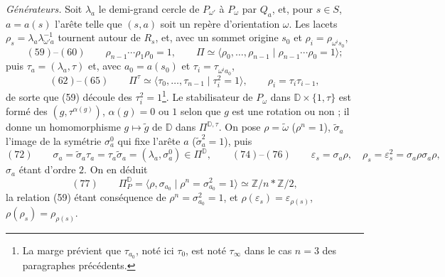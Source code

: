 \documentclass[11pt,a4paper]{article}
\begin{document}
\emph{Générateurs.} Soit $\lambda_a$ le demi-grand cercle de $P_{\omega'}$ à
$P_\omega$ par $Q_a$, et, pour $s \in S$, $a = a(s)$ l'arête telle que
$(s, a)$ soit un repère d'orientation $\omega$. Les lacets
$\rho_s = \lambda_a\lambda_{\omega' a}^{-1}$ tournent autour de $R_s$, et, avec
un sommet origine $s_0$ et $\rho_i = \rho_{\omega^i s_0}$,
\[
(59)\text{--}(60)\qquad \rho_{n-1}\cdots\rho_1\rho_0 = 1, \qquad
\Pi \simeq \langle \rho_0, \ldots, \rho_{n-1} \mid \rho_{n-1}\cdots\rho_0 = 1 \rangle ;
\]
puis $\tau_a = (\lambda_a, \tau)$ et, avec $a_0 = a(s_0)$ et
$\tau_i = \tau_{\omega^i a_0}$,
\[
(62)\text{--}(65)\qquad \Pi^{\tau} \simeq \langle \tau_0, \ldots, \tau_{n-1} \mid \tau_i^2 = 1 \rangle, \qquad \rho_i = \tau_i\tau_{i-1},
\]
de sorte que (59) découle des $\tau_i^2 = 1$\footnote{La marge prévient que
$\tau_{a_0}$, noté ici $\tau_0$, est noté $\tau_\infty$ dans le cas $n = 3$ des
paragraphes précédents.}. Le stabilisateur de $P_\omega$ dans
$\mathbb{D} \times \{1, \tau\}$ est formé des $(g, \tau^{\alpha(g)})$,
$\alpha(g) = 0$ ou $1$ selon que $g$ est une rotation ou non ; il donne un
homomorphisme $g \mapsto \tilde g$ de $\mathbb{D}$ dans $\Pi^{\mathbb{D},\tau}$.
On pose $\rho = \tilde\omega$ ($\rho^n = 1$), $\tilde\sigma_a$ l'image de la
symétrie $\sigma^0_a$ qui fixe l'arête $a$ ($\tilde\sigma_a^2 = 1$), puis
\[
(72)\qquad \sigma_a = \tilde\sigma_a\tau_a = \tau_a\tilde\sigma_a = (\lambda_a, \sigma^0_a) \in \Pi^{\mathbb{D}},
\qquad (74)\text{--}(76)\qquad \varepsilon_s = \sigma_a\rho, \quad \rho_s = \varepsilon_s^2 = \sigma_a\rho\sigma_a\rho,
\]
$\sigma_a$ étant d'ordre $2$. On en déduit
\[
(77)\qquad \Pi^{\mathbb{D}}_P = \langle \rho, \sigma_{a_0} \mid \rho^n = \sigma_{a_0}^2 = 1 \rangle \simeq \mathbb{Z}/n * \mathbb{Z}/2,
\]
la relation (59) étant conséquence de $\rho^n = \sigma_{a_0}^2 = 1$, et
$\rho(\varepsilon_s) = \varepsilon_{\rho(s)}$, $\rho(\rho_s) = \rho_{\rho(s)}$.
\end{document}
